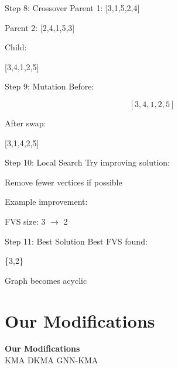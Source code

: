 \documentclass[aspectratio=169]{beamer}
\begin{document}
\begin{frame}{Step 8: Crossover}
	\centering
	Parent 1: [3,1,5,2,4]

	Parent 2: [2,4,1,5,3]

	\vspace{0.5cm}
	Child:

	\Huge
	[3,4,1,2,5]
\end{frame}

\begin{frame}{Step 9: Mutation}
	\centering
	Before:

	\[
		[3,4,1,2,5]
	\]

	\vspace{0.5cm}
	After swap:

	\Huge
	[3,1,4,2,5]
\end{frame}

\begin{frame}{Step 10: Local Search}
	\centering
	Try improving solution:

	\vspace{0.5cm}
	Remove fewer vertices if possible

	\vspace{0.5cm}
	Example improvement:

	\Huge
	FVS size: 3 $\rightarrow$ 2
\end{frame}

\begin{frame}{Step 11: Best Solution}
	\centering
	Best FVS found:

	\vspace{0.5cm}
	\Huge
	\{3,2\}

	\vspace{0.5cm}
	Graph becomes acyclic
\end{frame}






\section{Our Modifications}

\begin{frame}[plain]
	\centering
	\vspace{1.2cm}
	{\Huge \textbf{Our Modifications}}\\[8pt]
	{\Large KMA \quad DKMA \quad GNN-KMA}
\end{frame}
\end{document}
